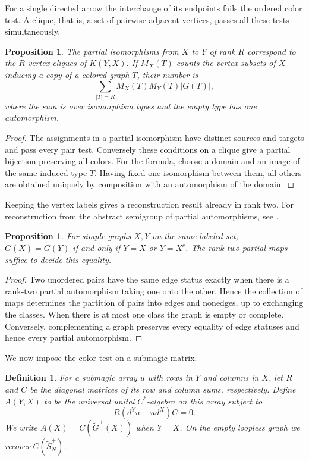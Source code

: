 \documentclass[11pt,a4paper]{article}
\newtheorem{prop}[thm]{Proposition}
\newtheorem{defn}[thm]{Definition}
\begin{document}
For a single directed arrow the interchange of its endpoints fails the ordered color test. A clique, that is, a set of pairwise adjacent vertices, passes all these tests simultaneously.

\begin{prop}\label{cliques}
The partial isomorphisms from $X$ to $Y$ of rank $R$ correspond to the $R$-vertex cliques of $K(Y,X)$. If $M_X(T)$ counts the vertex subsets of $X$ inducing a copy of a colored graph $T$, their number is
\[
 \sum_{|T|=R}M_X(T)M_Y(T)|G(T)|,
\]
where the sum is over isomorphism types and the empty type has one automorphism.
\end{prop}
\begin{proof}
The assignments in a partial isomorphism have distinct sources and targets and pass every pair test. Conversely these conditions on a clique give a partial bijection preserving all colors. For the formula, choose a domain and an image of the same induced type $T$. Having fixed one isomorphism between them, all others are obtained uniquely by composition with an automorphism of the domain.
\end{proof}

Keeping the vertex labels gives a reconstruction result already in rank two. For reconstruction from the abstract semigroup of partial automorphisms, see \cite{jaj}.

\begin{prop}\label{recover}
For simple graphs $X,Y$ on the same labeled set, $\widetilde G(X)=\widetilde G(Y)$ if and only if $Y=X$ or $Y=X^c$. The rank-two partial maps suffice to decide this equality.
\end{prop}
\begin{proof}
Two unordered pairs have the same edge status exactly when there is a rank-two partial automorphism taking one onto the other. Hence the collection of maps determines the partition of pairs into edges and nonedges, up to exchanging the classes. When there is at most one class the graph is empty or complete. Conversely, complementing a graph preserves every equality of edge statuses and hence every partial automorphism.
\end{proof}

We now impose the color test on a submagic matrix.

\begin{defn}
For a submagic array $u$ with rows in $Y$ and columns in $X$, let $R$ and $C$ be the diagonal matrices of its row and column sums, respectively. Define $A(Y,X)$ to be the universal unital $C^*$-algebra on this array subject to
\[
 R(d^Yu-ud^X)C=0.
\]
We write $A(X)=C(\widetilde G^+(X))$ when $Y=X$. On the empty loopless graph we recover $C(\widetilde S_N^+)$.
\end{defn}
\end{document}
